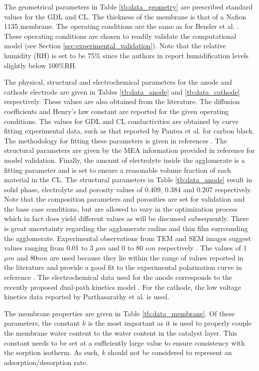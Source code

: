\documentclass[]{elsart}
\begin{document}
The geometrical parameters in Table \ref{tb:data_geometry} are prescribed standard values for the GDL and CL. The thickness of the membrane is that of a Nafion 1135 membrane. The operating conditions are the same as for Bender et al. \cite{Bender03}. These operating conditions are chosen to readily validate the computational model (see Section \ref{sec:experimental_validation}). Note that the relative humidity (RH) is set to be 75\% since the authors in \cite{Bender03} report humidification levels slightly below 100\%RH.

The physical, structural and electrochemical parameters for the anode and cathode electrode are given in Tables \ref{tb:data_anode} and \ref{tb:data_cathode} respectively. These values are also obtained from the literature. The diffusion coefficients and Henry's law constant are reported for the given operating conditions. The values for GDL and CL conductivities are obtained by curve fitting experimental data, such as that reported by Pantea et al. \cite{Pantea03} for carbon black. The methodology for fitting these parameters is given in references \cite{Secanell07c,Secanell07_thesis}. The structural parameters are given by the MEA information provided in reference \cite{Bender03} for model validation. Finally, the amount of electrolyte inside the agglomerate is a fitting parameter and is set to ensure a reasonable volume fraction of each material in the CL. The structural parameters in Table \ref{tb:data_anode} result in solid phase, electrolyte and porosity values of 0.409, 0.384 and 0.207 respectively. Note that the composition parameters and porosities are set for validation and the base case conditions, but are allowed to vary in the optimization process which in fact does yield different values as will be discussed subsequently. There is great uncertainty regarding the agglomerate radius and thin film surrounding the agglomerate. Experimental observations from TEM and SEM images suggest values ranging from 0.01 to 3 $\mu m$ and 0 to 80 $nm$ respectively \cite{Broka97,More06,Gode03,Jaouen02_a,Lee98}. The values of 1$\mu m$ and 80$nm$ are used because they lie within the range of values reported in the literature and provide a good fit to the experimental polarization curve in reference \cite{Bender03}. The electrochemical data used for the anode corresponds to the recently proposed dual-path kinetics model  \cite{Wang06}. For the cathode, the low voltage kinetics data reported by Parthasarathy et al. \cite{Parthasarathy92a,Parthasarathy92b} is used.

The membrane properties are given in Table \ref{tb:data_membrane}. Of these parameters, the constant $k$ is the most important as it is used to properly couple the membrane water content to the water content in the catalyst layer. This constant needs to be set at a sufficiently large value to ensure consistency with the sorption isotherm. As such,  $k$ should not be  considered to represent an adsorption/desorption rate.
\end{document}
